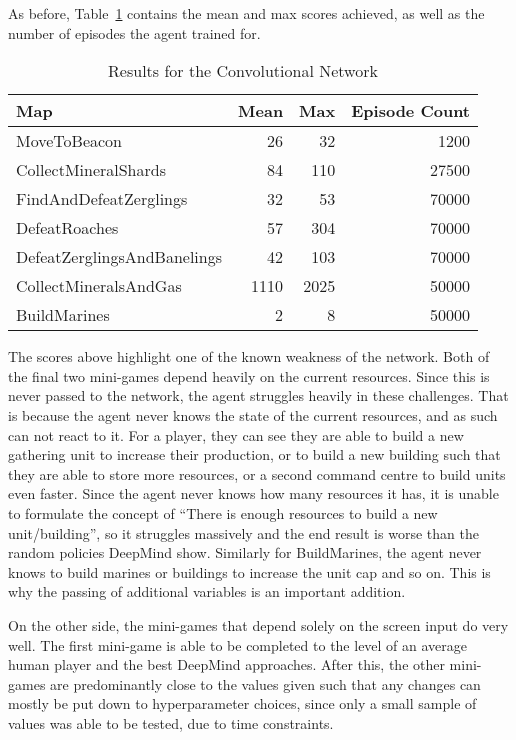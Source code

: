 As before, Table~\ref{tab:cnn_results} contains the mean and max
scores achieved, as well as the number of episodes the agent trained for.

\begin{table}[h]
    \centering
    \begin{tabular}{@{}lrrr@{}}
        \toprule
        Map                         & Mean & Max  & Episode Count \\ \midrule
        MoveToBeacon                & 26   & 32   & 1200  \\
        CollectMineralShards        & 84   & 110  & 27500 \\
        FindAndDefeatZerglings      & 32   & 53   & 70000 \\
        DefeatRoaches               & 57   & 304  & 70000 \\
        DefeatZerglingsAndBanelings & 42   & 103  & 70000 \\
        CollectMineralsAndGas       & 1110 & 2025 & 50000 \\
        BuildMarines                & 2    & 8    & 50000 \\ \bottomrule
    \end{tabular}
    \caption{Results for the Convolutional Network}%
    \label{tab:cnn_results}%
\end{table}

The scores above highlight one of the known weakness of the network. Both of the
final two mini-games depend heavily on the current resources. Since this is
never passed to the network, the agent struggles heavily in these challenges.
That is because the agent never knows the state of the current resources, and as
such can not react to it. For a player, they can see they are able to build a
new gathering unit to increase their production, or to build a new building such
that they are able to store more resources, or a second command centre to build
units even faster. Since the agent never knows how many resources it has, it is
unable to formulate the concept of ``There is enough resources to build a new
unit/building'', so it struggles massively and the end result is worse than the
random policies DeepMind show. Similarly for BuildMarines, the agent never knows
to build marines or buildings to increase the unit cap and so on. This is why
the passing of additional variables is an important addition.

On the other side, the mini-games that depend solely on the screen input do very
well. The first mini-game is able to be completed to the level of an average
human player and the best DeepMind approaches. After this, the other mini-games
are predominantly close to the values given such that any changes can mostly be
put down to hyperparameter choices, since only a small sample of values was able
to be tested, due to time constraints.

